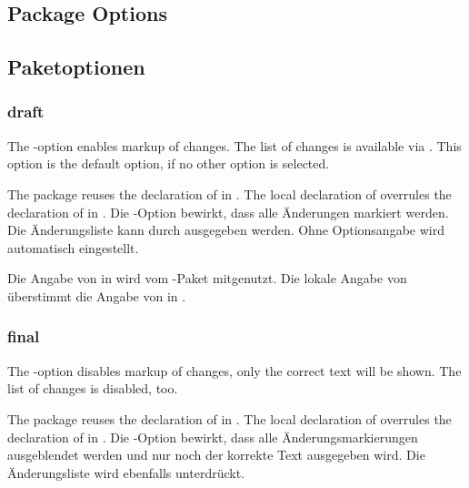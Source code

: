 \ifENGLISH
	\subsection{Package Options}
\fi
	\ifGERMAN
		\subsection{Paketoptionen}
	\fi
\label{sec:user:options}

\subsubsection{draft}
\ifENGLISH
	The -option enables markup of changes.
	The list of changes is available via .
	This option is the default option, if no other option is selected.

	The  package reuses the declaration of  in .
	The local declaration of  overrules the declaration of  in .
\fi
	\ifGERMAN
		Die -Option bewirkt, dass alle Änderungen markiert werden.
		Die Änderungsliste kann durch  ausgegeben werden.
		Ohne Optionsangabe wird  automatisch eingestellt.

		Die Angabe von  in  wird vom -Paket mitgenutzt.
		Die lokale Angabe von  überstimmt die Angabe von  in .
	\fi


\subsubsection{final}
\ifENGLISH
	The -option disables markup of changes, only the correct text will be shown.
	The list of changes is disabled, too.

	The  package reuses the declaration of  in .
	The local declaration of  overrules the declaration of  in .
\fi
	\ifGERMAN
		Die -Option bewirkt, dass alle Änderungsmarkierungen ausgeblendet werden und nur noch der korrekte Text ausgegeben wird.
		Die Änderungsliste wird ebenfalls unterdrückt.

